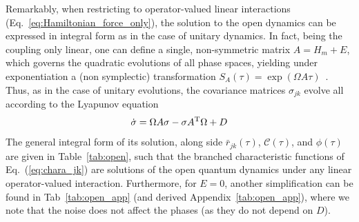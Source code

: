 \documentclass[%
reprint,
superscriptaddress,
nofootinbib,
 amsmath,amssymb,
prx,
floatfix,
]{revtex4-2}
\begin{document}
Remarkably, when restricting to operator-valued linear interactions (Eq.~\ref{eq:Hamiltonian_force_only}), the solution to the open dynamics can be expressed in integral form as in the case of unitary dynamics. In fact, being the coupling only linear, one can define a single, non-symmetric matrix $A = H_m + E$, which governs the quadratic evolutions of all phase spaces, yielding under exponentiation a (non symplectic) transformation $S_A(\tau) = \exp( \Omega A \tau)$~\cite{serafini_quantum_2017}. Thus, as in the case of unitary evolutions, the covariance matrices $\sigma_{jk}$ evolve all according to the Lyapunov equation
\begin{equation}
\label{eq:Lyapunov_sol}
    \dot{\sigma} =  \Omega A \sigma - \sigma A^{\rm T} \Omega + D 
\end{equation}
The general integral form of its solution, along side $\bar{r}_{jk}(\tau)$, $\mathcal{C} (\tau)$, and $\phi (\tau)$ are given in Table~\ref{tab:open}, such that the branched characteristic functions of Eq.~(\ref{eq:chara_jk}) are solutions of the open quantum dynamics under any linear operator-valued interaction. Furthermore, for $E=0$, another simplification can be found in  Tab~\ref{tab:open_app} (and derived Appendix~\ref{tab:open_app}), where we note that the noise does not affect the phases (as they do not depend on $D$). 
\end{document}
